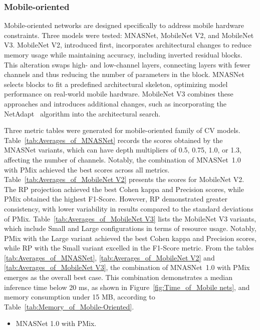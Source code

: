 




\FloatBarrier

\subsubsection{Mobile-oriented}

Mobile-oriented networks are designed specifically to address mobile hardware constraints. Three models were tested: MNASNet, MobileNet V2, and MobileNet V3. MobileNet V2, introduced first, incorporates architectural changes to reduce memory usage while maintaining accuracy, including inverted residual blocks. This alteration swaps high- and low-channel layers, connecting layers with fewer channels and thus reducing the number of parameters in the block. MNASNet selects blocks to fit a predefined architectural skeleton, optimizing model performance on real-world mobile hardware. MobileNet V3 combines these approaches and introduces additional changes, such as incorporating the NetAdapt~\cite{NetAdapt} algorithm into the architectural search.


Three metric tables were generated for mobile-oriented family of \gls{CV} models.
Table~\ref{tab:Averages_of_MNASNet} records the scores obtained by the MNASNet variants, which can have depth multipliers of 0.5, 0.75, 1.0, or 1.3, affecting the number of channels. Notably, the combination of \mbox{MNASNet 1.0} with \gls{PMix} achieved the best scores across all metrics.
Table~\ref{tab:Averages_of_MobileNet V2} presents the scores for MobileNet V2. The \gls{RP} projection achieved the best Cohen kappa and Precision scores, while \gls{PMix} obtained the highest F1-Score. However, \gls{RP} demonstrated greater consistency, with lower variability in results compared to the standard deviations of \gls{PMix}.
Table~\ref{tab:Averages_of_MobileNet V3} lists the MobileNet V3 variants, which include Small and Large configurations in terms of resource usage. Notably, \gls{PMix} with the Large variant achieved the best Cohen kappa and Precision scores, while \gls{RP} with the Small variant excelled in the F1-Score metric.
From the tables \ref{tab:Averages_of_MNASNet}, \ref{tab:Averages_of_MobileNet V2} and \ref{tab:Averages_of_MobileNet V3}, the combination of \mbox{MNASNet 1.0} with \gls{PMix} emerges as the overall best case. This combination demonstrates a median inference time below 20 ms, as shown in Figure~\ref{fig:Time_of_Mobile nets}, and memory consumption under 15 MB, according to Table~\ref{tab:Memory_of_Mobile-Oriented}.  
\begin{itemize}
	\item MNASNet 1.0 with \gls{PMix}.
\end{itemize}

